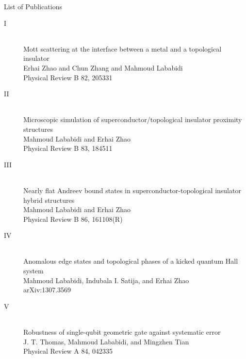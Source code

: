 \documentclass[11pt,letterpaper]{report}
\begin{document}
\vspace{1em}
\noindent List of Publications
\begin{description}
\item[I] \hfill\\
Mott scattering at the interface between a metal and a topological insulator\\
Erhai Zhao and Chun Zhang and Mahmoud Lababidi\\
Physical Review B 82, 205331
\item[II] \hfill \\
Microscopic simulation of superconductor/topological insulator proximity structures\\
Mahmoud Lababidi and Erhai Zhao\\
Physical Review B 83, 184511
\item[III] \hfill\\
Nearly flat Andreev bound states in superconductor-topological insulator hybrid structures\\
Mahmoud Lababidi and Erhai Zhao\\
Physical Review B 86, 161108(R)
\item[IV] \hfill\\
Anomalous edge states and topological phases of a kicked quantum Hall system\\
Mahmoud Lababidi, Indubala I. Satija, and Erhai Zhao\\
arXiv:1307.3569
\item[V] \hfill\\
Robustness of single-qubit geometric gate against systematic error\\
J. T. Thomas, Mahmoud Lababidi, and Mingzhen Tian\\
Physical Review A 84, 042335
\end{description}
\end{document}
